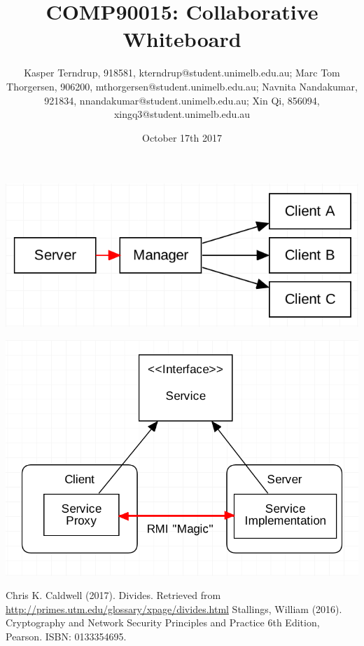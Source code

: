 \documentclass[10pt,a4paper,article,oneside]{memoir}
\title{COMP90015: Collaborative Whiteboard}
\author{Kasper Terndrup, 918581, kterndrup@student.unimelb.edu.au;
Marc Tom Thorgersen, 906200, mthorgersen@student.unimelb.edu.au;
Navnita Nandakumar, 921834, nnandakumar@student.unimelb.edu.au;
Xin Qi, 856094, xingq3@student.unimelb.edu.au}
\date{October 17th 2017}
\begin{document}
\maketitle


\includegraphics{sysarch}

\includegraphics{commp}





\newpage

\begin{thebibliography}{99}
 Chris K. Caldwell (2017). Divides. Retrieved from \url{http://primes.utm.edu/glossary/xpage/divides.html}
 Stallings, William (2016). Cryptography and Network Security Principles and Practice 6th Edition, Pearson. ISBN: 0133354695.
\end{thebibliography}
\end{document}
